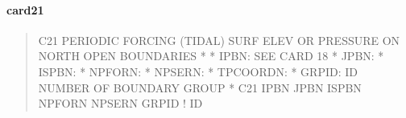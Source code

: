 \documentclass[letterpaper,10pt,english]{sphinxmanual}
\begin{document}
\paragraph{card21}
\label{\detokenize{inputfiles/runcontrol/card21:card21}}\label{\detokenize{inputfiles/runcontrol/card21::doc}}\begin{quote}

\begin{sphinxVerbatim}[commandchars=\\\{\}]
\PYGZhy{}\PYGZhy{}\PYGZhy{}\PYGZhy{}\PYGZhy{}\PYGZhy{}\PYGZhy{}\PYGZhy{}\PYGZhy{}\PYGZhy{}\PYGZhy{}\PYGZhy{}\PYGZhy{}\PYGZhy{}\PYGZhy{}\PYGZhy{}\PYGZhy{}\PYGZhy{}\PYGZhy{}\PYGZhy{}\PYGZhy{}\PYGZhy{}\PYGZhy{}\PYGZhy{}\PYGZhy{}\PYGZhy{}\PYGZhy{}\PYGZhy{}\PYGZhy{}\PYGZhy{}\PYGZhy{}\PYGZhy{}\PYGZhy{}\PYGZhy{}\PYGZhy{}\PYGZhy{}\PYGZhy{}\PYGZhy{}\PYGZhy{}\PYGZhy{}\PYGZhy{}\PYGZhy{}\PYGZhy{}\PYGZhy{}\PYGZhy{}\PYGZhy{}\PYGZhy{}\PYGZhy{}\PYGZhy{}\PYGZhy{}\PYGZhy{}\PYGZhy{}\PYGZhy{}\PYGZhy{}\PYGZhy{}\PYGZhy{}\PYGZhy{}\PYGZhy{}\PYGZhy{}\PYGZhy{}\PYGZhy{}\PYGZhy{}\PYGZhy{}\PYGZhy{}\PYGZhy{}\PYGZhy{}\PYGZhy{}\PYGZhy{}\PYGZhy{}\PYGZhy{}\PYGZhy{}\PYGZhy{}\PYGZhy{}\PYGZhy{}\PYGZhy{}\PYGZhy{}\PYGZhy{}\PYGZhy{}
C21 PERIODIC FORCING (TIDAL) SURF ELEV OR PRESSURE ON NORTH OPEN BOUNDARIES
*
*  IPBN: SEE CARD 18
*  JPBN:
*  ISPBN:
*  NPFORN:
*  NPSERN:
*  TPCOORDN: 
*  GRPID: ID NUMBER OF BOUNDARY GROUP
*
C21    IPBN    JPBN   ISPBN  NPFORN  NPSERN      GRPID ! ID
\end{sphinxVerbatim}
\end{quote}
\end{document}
